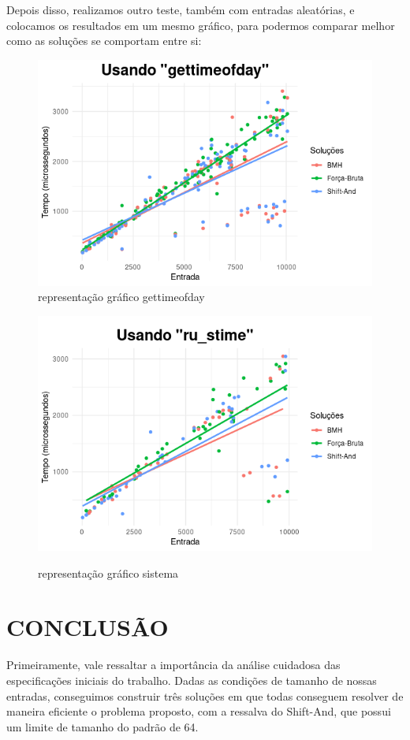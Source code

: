 \documentclass[12pt]{article}
\begin{document}
            Depois disso, realizamos outro teste, também com entradas aleatórias, e colocamos os resultados em um mesmo gráfico, para 
            podermos comparar melhor como as soluções se comportam entre si:
            
            \begin{figure}[H]
                \centering
                \includegraphics[width=0.6\linewidth]{Figuras/graficoGeralGTOD.png}\\
                \caption{representação gráfico gettimeofday}
                \label{fig:GraficoForcaBruta}
            
                \includegraphics[width=0.6\linewidth]{Figuras/graficoGeralSistema.png}\\
                \caption{representação gráfico sistema}
                \label{fig:GraficoBMH}
            \end{figure}

    \section{CONCLUSÃO}
        Primeiramente, vale ressaltar a importância da análise cuidadosa das especificações iniciais do trabalho. Dadas as condições de tamanho 
        de nossas entradas, conseguimos construir três soluções em que todas conseguem resolver de maneira eficiente o problema proposto, com a 
        ressalva do Shift-And, que possui um limite de tamanho do padrão de 64.
\end{document}
